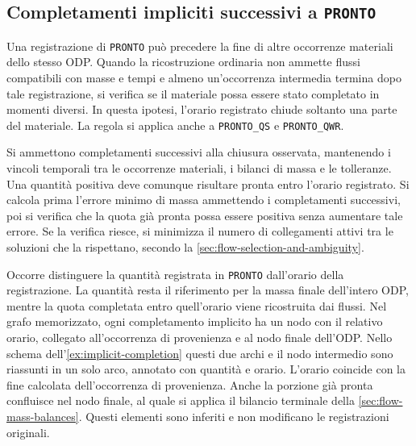 \subsection{Completamenti impliciti successivi a \texttt{PRONTO}}
\label{sec:implicit-completions}

Una registrazione di \texttt{PRONTO} può precedere la fine di altre occorrenze materiali dello stesso ODP. Quando la ricostruzione ordinaria non ammette flussi compatibili con masse e tempi e almeno un'occorrenza intermedia termina dopo tale registrazione, si verifica se il materiale possa essere stato completato in momenti diversi. In questa ipotesi, l'orario registrato chiude soltanto una parte del materiale. La regola si applica anche a \texttt{PRONTO\_QS} e \texttt{PRONTO\_QWR}.

Si ammettono completamenti successivi alla chiusura osservata, mantenendo i vincoli temporali tra le occorrenze materiali, i bilanci di massa e le tolleranze. Una quantità positiva deve comunque risultare pronta entro l'orario registrato. Si calcola prima l'errore minimo di massa ammettendo i completamenti successivi, poi si verifica che la quota già pronta possa essere positiva senza aumentare tale errore. Se la verifica riesce, si minimizza il numero di collegamenti attivi tra le soluzioni che la rispettano, secondo la \cref{sec:flow-selection-and-ambiguity}.

Occorre distinguere la quantità registrata in \texttt{PRONTO} dall'orario della registrazione. La quantità resta il riferimento per la massa finale dell'intero ODP, mentre la quota completata entro quell'orario viene ricostruita dai flussi. Nel grafo memorizzato, ogni completamento implicito ha un nodo con il relativo orario, collegato all'occorrenza di provenienza e al nodo finale dell'ODP. Nello schema dell'\cref{ex:implicit-completion} questi due archi e il nodo intermedio sono riassunti in un solo arco, annotato con quantità e orario. L'orario coincide con la fine calcolata dell'occorrenza di provenienza. Anche la porzione già pronta confluisce nel nodo finale, al quale si applica il bilancio terminale della \cref{sec:flow-mass-balances}. Questi elementi sono inferiti e non modificano le registrazioni originali.

